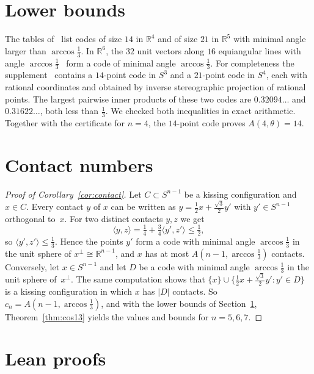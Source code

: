 \documentclass[11pt]{amsart}
\theoremstyle{remark}
\newcommand{\R}{\mathbb{R}}
\begin{document}
\section{Lower bounds}\label{sec:lower}

The tables of~\cite{Sl} list codes of size $14$ in $\R^4$ and of size $21$ in $\R^5$ with minimal angle larger than $\arccos\frac13$. In $\R^6$, the $32$ unit vectors along $16$ equiangular lines with angle $\arccos\frac13$~\cite{vLS} form a code of minimal angle $\arccos\frac13$. For completeness the supplement~\cite{supp13} contains a $14$-point code in $S^3$ and a $21$-point code in $S^4$, each with rational coordinates and obtained by inverse stereographic projection of rational points. The largest pairwise inner products of these two codes are $0.32094\ldots$ and $0.31622\ldots$, both less than $\frac13$. We checked both inequalities in exact arithmetic. Together with the certificate for $n=4$, the $14$-point code proves $A(4,\theta)=14$.

\section{Contact numbers}\label{sec:contact}

\begin{proof}[Proof of Corollary~\ref{cor:contact}]
Let $C\subset S^{n-1}$ be a kissing configuration and $x\in C$. Every contact $y$ of $x$ can be written as $y=\frac12x+\frac{\sqrt3}{2}y'$ with $y'\in S^{n-1}$ orthogonal to~$x$. For two distinct contacts $y,z$ we get
\[
\langle y,z\rangle=\tfrac14+\tfrac34\langle y',z'\rangle\le\tfrac12 ,
\]
so $\langle y',z'\rangle\le\frac13$. Hence the points $y'$ form a code with minimal angle $\arccos\frac13$ in the unit sphere of $x^\perp\cong\R^{n-1}$, and $x$ has at most $A(n-1,\arccos\frac13)$ contacts. Conversely, let $x\in S^{n-1}$ and let $D$ be a code with minimal angle $\arccos\frac13$ in the unit sphere of~$x^\perp$. The same computation shows that $\{x\}\cup\{\frac12x+\frac{\sqrt3}{2}y':y'\in D\}$ is a kissing configuration in which $x$ has $|D|$ contacts. So $c_n=A(n-1,\arccos\frac13)$, and with the lower bounds of Section~\ref{sec:lower}, Theorem~\ref{thm:cos13} yields the values and bounds for $n=5,6,7$.
\end{proof}

\section{Lean proofs}\label{sec:lean}
\end{document}
